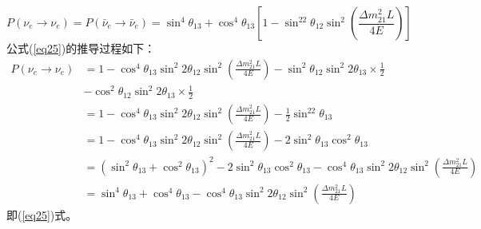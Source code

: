 \documentclass{article}
\begin{document}
		\begin{equation}
			P(\nu_e\to\nu_e)=P(\bar{\nu}_e\to\bar{\nu}_e)=\sin^4\theta_{13}+\cos^4\theta_{13}\left[1-\sin^22\theta_{12}\sin^2\left(\frac{\Delta m_{21}^2L}{4E}\right)\right]
			\label{eq25}
		\end{equation}
		公式(\ref{eq25})的推导过程如下：
		\begin{equation*}
			\begin{aligned}
				P(\nu_e\to\nu_e)&=1-\cos^{4}\theta_{13}\sin^{2}2\theta_{12}\sin^2\left(\frac{\Delta m_{21}^2L}{4E}\right)-\sin^{2}\theta_{12}\sin^{2}2\theta_{13}\times\frac{1}{2}\\
				&-\cos^{2}\theta_{12}\sin^{2}2\theta_{13}\times\frac{1}{2}\\
				&=1-\cos^{4}\theta_{13}\sin^{2}2\theta_{12}\sin^2\left(\frac{\Delta m_{21}^2L}{4E}\right)-\frac{1}{2}\sin^22\theta_{13}\\
				&=1-\cos^{4}\theta_{13}\sin^{2}2\theta_{12}\sin^2\left(\frac{\Delta m_{21}^2L}{4E}\right)-2\sin^2\theta_{13}\cos^2\theta_{13}\\
				&=(\sin^2\theta_{13}+\cos^2\theta_{13})^2-2\sin^2\theta_{13}\cos^2\theta_{13}-\cos^{4}\theta_{13}\sin^{2}2\theta_{12}\sin^2\left(\frac{\Delta m_{21}^2L}{4E}\right)\\
				&=\sin^4\theta_{13}+\cos^4\theta_{13}-\cos^{4}\theta_{13}\sin^{2}2\theta_{12}\sin^2\left(\frac{\Delta m_{21}^2L}{4E}\right)
			\end{aligned}
		\end{equation*}
		即(\ref{eq25})式。
\end{document}
